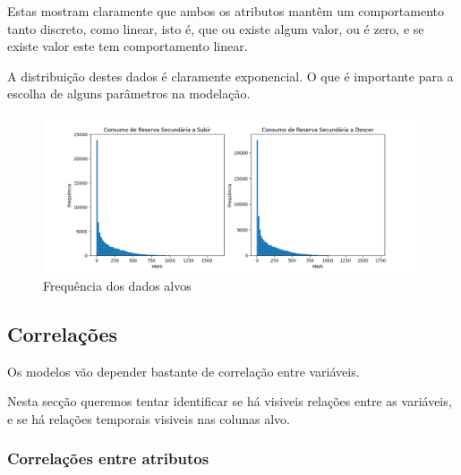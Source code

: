 Estas mostram claramente que ambos os atributos mantêm um comportamento tanto discreto, como linear, isto é, que ou existe algum valor, ou é zero, e se existe valor este tem comportamento linear.\par
A distribuição destes dados é claramente exponencial. O que é importante para a escolha de alguns parâmetros na modelação.\par

		
\begin{figure}[H]
  \centering
  \includegraphics[width=\textwidth]{plots/target_histograms.png}
  \caption{Frequência dos dados alvos}
  \label{fig:targethistograms}
\end{figure}


\subsection{Correlações}

Os modelos vão depender bastante de correlação entre variáveis.

Nesta secção queremos tentar identificar se há visiveis relações entre as variáveis, e se há relações temporais  visiveis nas colunas alvo.


\subsubsection{Correlações entre atributos}


